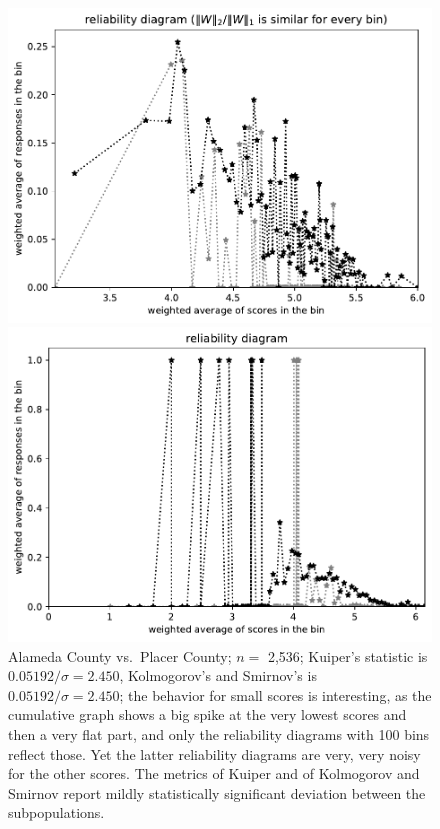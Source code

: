 \documentclass{article}
\newlength{\imsize}
\begin{document}
\begin{figure}
\begin{centering}
\parbox{\imsize}{\includegraphics[width=\imsize]
{../codes/weighted/County_of_Alameda_vs_Placer-LNGI/equierrs100.pdf}}
\quad\quad
\parbox{\imsize}{\includegraphics[width=\imsize]
{../codes/weighted/County_of_Alameda_vs_Placer-LNGI/equiscores100.pdf}}

\end{centering}
\caption{Alameda County vs.\ Placer County; $n =$ 2,536;
         Kuiper's statistic is $0.05192 / \sigma = 2.450$,
         Kolmogorov's and Smirnov's is $0.05192 / \sigma = 2.450$;
         the behavior for small scores is interesting,
         as the cumulative graph shows a big spike at the very lowest scores
         and then a very flat part, and only the reliability diagrams
         with 100 bins reflect those. Yet the latter reliability diagrams
         are very, very noisy for the other scores. 
         The metrics of Kuiper and of Kolmogorov and Smirnov report
         mildly statistically significant deviation between the subpopulations.
}
\label{Alameda-Placer}
\end{figure}
\end{document}
